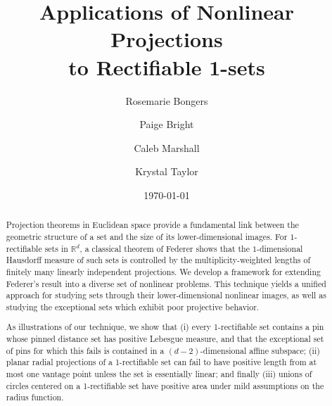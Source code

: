 \documentclass[12pt]{amsart}
\theoremstyle{definition}
\numberwithin{equation}{section}
\begin{document}
%
% 
\title[Applications of Nonlinear Projections]{Applications of Nonlinear Projections\\to Rectifiable 1-sets}

\author[R.~Bongers]{Rosemarie Bongers}
\address{Department of Applied Mathematics \\ University of California, Merced, Merced, CA}

\author[P.~Bright]{Paige Bright}
\address{Department of Mathematics \\ Massachusetts Institute of Technology, Cambridge, MA}

\author[C.~Marshall]{Caleb Marshall}
\address{Department of Mathematics \\ The University of Toronto, Toronto, ON, Canada}

\author[K.~Taylor]{Krystal Taylor}
\address{Department of Mathematics, The Ohio State University, Columbus, OH}


\date{\today}




\begin{abstract}
Projection theorems in Euclidean space provide a fundamental link between the geometric structure of a set and the size of its lower-dimensional images. For $1$-rectifiable sets in $\mathbb{R}^d$, a classical theorem of Federer shows that the $1$-dimensional Hausdorff measure of such sets is controlled by the multiplicity-weighted lengths of finitely many linearly independent projections. We develop a framework for extending Federer's result into a diverse set of nonlinear problems. This technique yields a unified approach for studying sets through their lower-dimensional nonlinear images, as well as studying the exceptional sets which exhibit poor projective behavior.

As illustrations of our technique, we show that (i) every 1-rectifiable set contains a pin whose pinned distance set has positive Lebesgue measure, and that the exceptional set of pins for which this fails is contained in a $(d-2)$-dimensional affine subspace; (ii) planar radial projections of a 1-rectifiable set can fail to have positive length from at most one vantage point unless the set is essentially linear; and finally (iii) unions of circles centered on a 1-rectifiable set have positive area under mild assumptions on the radius function. 
\end{abstract}
\end{document}
